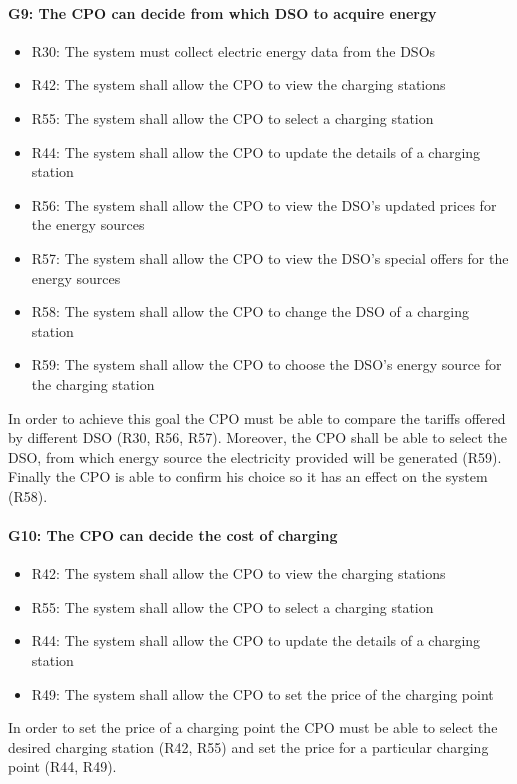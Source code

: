 \paragraph{G9: The CPO can decide from which DSO to acquire energy}
\begin{itemize}
    \item R30: The system must collect electric energy data from the DSOs
    \item R42: The system shall allow the CPO to view the charging stations
    \item R55: The system shall allow the CPO to select a charging station
    \item R44: The system shall allow the CPO to update the details of a charging station
    \item R56: The system shall allow the CPO to view the DSO's updated prices for the energy sources
    \item R57: The system shall allow the CPO to view the DSO's special offers for the energy sources
    \item R58: The system shall allow the CPO to change the DSO of a charging station
    \item R59: The system shall allow the CPO to choose the DSO's energy source for the charging station
\end{itemize}
In order to achieve this goal the CPO must be able to compare the tariffs offered by different DSO (R30, R56, R57). Moreover, the CPO shall be able to select the DSO, from which energy source the electricity provided will be generated (R59). Finally the CPO is able to confirm his choice so it has an effect on the system (R58).
\paragraph{G10: The CPO can decide the cost of charging}
\begin{itemize}
    \item R42: The system shall allow the CPO to view the charging stations
    \item R55: The system shall allow the CPO to select a charging station
    \item R44: The system shall allow the CPO to update the details of a charging station
    \item R49: The system shall allow the CPO to set the price of the charging point
\end{itemize}
In order to set the price of a charging point the CPO must be able to select the desired charging station (R42, R55) and set the price for a particular charging point (R44, R49).

